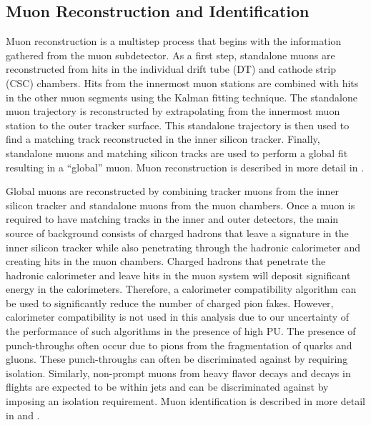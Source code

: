\subsection{Muon Reconstruction and Identification}\label{ss:muonreco}

Muon reconstruction is a multistep process that begins with the information gathered from the muon subdetector. As a
first step, standalone muons are reconstructed from hits in the individual drift tube (DT) and
cathode strip (CSC) chambers. Hits from the innermost muon stations are combined with hits in the other muon segments
using the Kalman fitting technique. The standalone muon trajectory is reconstructed by extrapolating from the
innermost muon station to the outer tracker surface. This standalone trajectory is then used to find a matching track
reconstructed in the inner silicon tracker. Finally, standalone muons and matching silicon tracks are used to perform a
global fit resulting in a ``global'' muon. Muon reconstruction is described in more detail in \cite{CMS_MUO_10-004}.

Global muons are reconstructed by combining tracker muons from the inner silicon tracker and standalone muons from the
muon chambers. Once a muon is required to have matching tracks in the inner and outer detectors,
the main source of background consists of charged hadrons that leave a
signature in the inner silicon tracker while also penetrating through the hadronic calorimeter and creating hits in the
muon chambers. Charged hadrons that penetrate the hadronic calorimeter and leave hits in the muon system will deposit 
significant energy in the calorimeters. Therefore, a calorimeter compatibility algorithm can be used to significantly 
reduce the number of charged pion fakes. However, calorimeter compatibility is not used in this analysis due to our 
uncertainty of the performance of such algorithms in the presence of high PU. 
The presence of punch-throughs often occur due to pions from the fragmentation of quarks and gluons. These punch-throughs 
can often be discriminated against by requiring isolation. Similarly, non-prompt muons from heavy flavor decays and 
decays in flights are expected to be within jets and can be discriminated against by imposing an isolation requirement. 
Muon identification is described in more detail in \cite{CMS_MUO_10-004} and \cite{CMS_MUO_11-001}.

